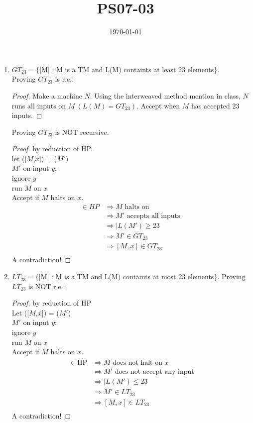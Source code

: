 \documentclass{article}
\title{PS07-03}
\date{\today}
\begin{document}
\maketitle
\begin{enumerate}[label=\alph*.]
	\item $GT_{23} = \{$[M] : M is a TM and L(M) containts at least 23 elements$\}$.\\
	Proving $GT_{23}$ is r.e.:
	\begin{proof}
	Make a machine $N$.
	Using the interweaved method mention in class, $N$ runs all inputs on $M\ ( L(M) = GT_{23})$. Accept when $M$ has accepted 23 inputs.\end{proof}
	Proving $GT_{23}$ is NOT recursive.
	\begin{proof} by reduction of HP.\\
	let ([$M$,$x$]) = ($M'$)\\
	$M'$ on input $y$:\\
	ignore $y$\\
	run $M$ on $x$\\
	Accept if $M$ halts on $x$.
	\begin{align*}
	[M,x] \in HP &\Rightarrow M \text{ halts on }\\
	&\Rightarrow M' \text{ accepts all inputs }\\
	&\Rightarrow \lvert L(M') \geq 23\\
	&\Rightarrow M' \in GT_{23}\\
	&\Rightarrow [M,x] \in GT_{23}\\
	\end{align*}
	A contradiction!
	\end{proof}
	\item $LT_{23} = \{$[M] : M is a TM and L(M) containts at most 23 elements$\}$.
	Proving $LT_{23}$ is NOT r.e.:
	\begin{proof} by reduction of $\overline{\text{HP}}$\\
	Let ([$M$,$x$]) = ($M'$)\\
	$M'$ on input $y$:\\
	ignore $y$\\
	run $M$ on $x$\\
	Accept if $M$ halts on $x$.
	\begin{align*}
	[M,x] \in \overline{\text{HP}} &\Rightarrow M \text{ does not halt on }x\\
	&\Rightarrow M' \text{ does not accept any input}\\
	&\Rightarrow \lvert L(M') \leq 23\\
	&\Rightarrow M' \in LT_{23}\\
	&\Rightarrow [M,x] \in LT_{23}\\
	\end{align*}
	A contradiction!
	\end{proof}

\end{enumerate}
\end{document}
